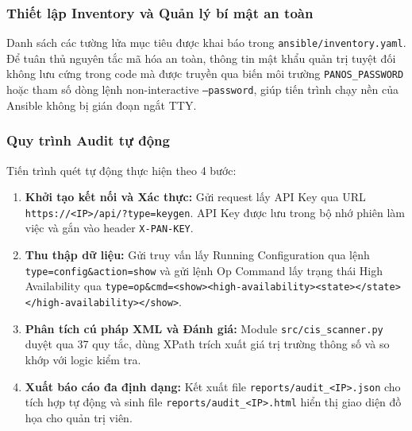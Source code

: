 \documentclass[12pt,a4paper]{article}
\begin{document}
\subsubsection{Thiết lập Inventory và Quản lý bí mật an toàn}
\noindent Danh sách các tường lửa mục tiêu được khai báo trong \texttt{ansible/inventory.yaml}. Để tuân thủ nguyên tắc mã hóa an toàn, thông tin mật khẩu quản trị tuyệt đối không lưu cứng trong code mà được truyền qua biến môi trường \texttt{PANOS\_PASSWORD} hoặc tham số dòng lệnh non-interactive \texttt{--password}, giúp tiến trình chạy nền của Ansible không bị gián đoạn ngắt TTY.

\subsubsection{Quy trình Audit tự động}
\noindent Tiến trình quét tự động thực hiện theo 4 bước:
\begin{enumerate}
    \item \textbf{Khởi tạo kết nối và Xác thực:} Gửi request lấy API Key qua URL \texttt{https://<IP>/api/?type=keygen}. API Key được lưu trong bộ nhớ phiên làm việc và gắn vào header \texttt{X-PAN-KEY}.
    \item \textbf{Thu thập dữ liệu:} Gửi truy vấn lấy Running Configuration qua lệnh \texttt{type=config\&action=show} và gửi lệnh Op Command lấy trạng thái High Availability qua \texttt{type=op\&cmd=<show><high-availability><state></state></high-availability></show>}.
    \item \textbf{Phân tích cú pháp XML và Đánh giá:} Module \texttt{src/cis\_scanner.py} duyệt qua 37 quy tắc, dùng XPath trích xuất giá trị trường thông số và so khớp với logic kiểm tra.
    \item \textbf{Xuất báo cáo đa định dạng:} Kết xuất file \texttt{reports/audit\_<IP>.json} cho tích hợp tự động và sinh file \texttt{reports/audit\_<IP>.html} hiển thị giao diện đồ họa cho quản trị viên.
\end{enumerate}
\end{document}
